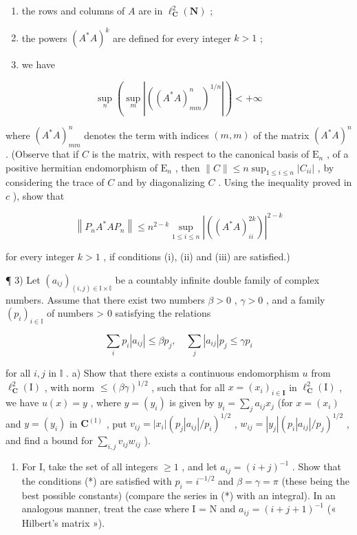 \begin{enumerate}
\begin{enumerate}
\def\labelenumi{(\roman{enumi})}
\item
  the rows and columns of \(A\) are in \(\ell_{\mathbf{C}}^{2}(\mathbf{N})\) ;
\item
  the powers \((A^{*}A)^{k}\) are defined for every integer \(k > 1\) ;
\item
  we have
\end{enumerate}

\[
\sup _ {n} \left(\sup _ {m} | ((A ^ {*} A) _ {m m} ^ {n}) ^ {1 / n} |\right) <   + \infty
\]

where \((A^{*}A)_{mm}^{n}\) denotes the term with indices \((m,m)\) of the matrix \((A^{*}A)^{n}\) . (Observe that if \(C\) is the matrix, with respect to the canonical basis of \(\mathrm{E}_n\) , of a positive hermitian endomorphism of \(\mathrm{E}_n\) , then \(\| C\| \leqslant n\sup_{1\leqslant i\leqslant n}|C_{ii}|\) , by considering the trace of \(C\) and by diagonalizing \(C\) . Using the inequality proved in \(c\) ), show that

\[
\left\| P _ {n} A ^ {*} A P _ {n} \right\| \leqslant n ^ {2 - k} \sup _ {1 \leqslant i \leqslant n} \left| ((A ^ {*} A) _ {i i} ^ {2 k}) \right| ^ {2 - k}
\]

for every integer \(k > 1\) , if conditions (i), (ii) and (iii) are satisfied.)

¶ 3) Let \((a_{ij})_{(i,j)\in\mathbb{I}\times\mathbb{I}}\) be a countably infinite double family of complex numbers. Assume that there exist two numbers \(\beta > 0\) , \(\gamma > 0\) , and a family \((p_i)_{i\in\mathbb{I}}\) of numbers > 0 satisfying the relations

\[
\sum_ {i} p _ {i} | a _ {i j} | \leqslant \beta p _ {j}, \quad \sum_ {j} | a _ {i j} | p _ {j} \leqslant \gamma p _ {i}\tag{*}
\]

for all \(i, j\) in \(\mathbb{I}\) .
a) Show that there exists a continuous endomorphism \(u\) from \(\ell_{\mathbf{C}}^2 (\mathrm{I})\) , with norm \(\leqslant (\beta \gamma)^{1 / 2}\) , such that for all \(x = (x_{i})_{i\in \mathbf{I}}\) in \(\ell_{\mathbf{C}}^2 (\mathrm{I})\) , we have \(u(x) = y\) , where \(y = (y_{i})\) is given by \(y_{i} = \sum_{j}a_{ij}x_{j}\) (for \(x = (x_{i})\) and \(y = (y_{i})\) in \(\mathbf{C}^{(\mathbb{I})}\) , put \(v_{ij} = |x_i| (p_j|a_{ij}| / p_i)^{1 / 2}\) , \(w_{ij} = |y_j|(p_i|a_{ij}| / p_j)^{1 / 2}\) , and find a bound for \(\sum_{i,j}v_{ij}w_{ij}\) ).

\begin{enumerate}
\def\labelenumi{\alph{enumi})}
\setcounter{enumi}{1}
\tightlist
\item
  For I, take the set of all integers \(\geqslant 1\) , and let \(a_{ij} = (i + j)^{-1}\) . Show that the conditions (*) are satisfied with \(p_i = i^{-1/2}\) and \(\beta = \gamma = \pi\) (these being the best possible constants) (compare the series in (*) with an integral). In an analogous manner, treat the case where I = N and \(a_{ij} = (i + j + 1)^{-1}\) (« Hilbert's matrix »).
\end{enumerate}


\end{enumerate}
